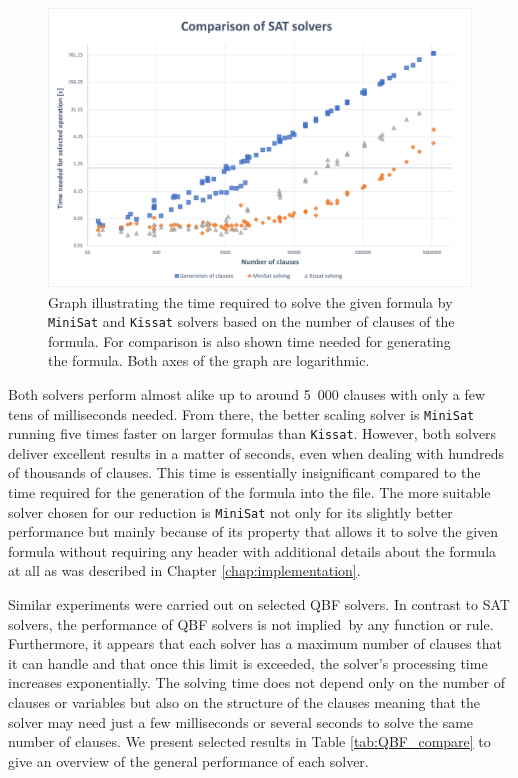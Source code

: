 \begin{figure}[ht]
    \label{fig:graph_SAT_compare}
    \centering
    \includegraphics[width=1\linewidth]{obrazky-figures/SAT_comparison.pdf}
    \caption{Graph illustrating the time required to solve the given formula by \texttt{MiniSat} and \texttt{Kissat} solvers based on the number of clauses of the formula. For comparison is also shown time needed for generating the formula. Both axes of the graph are logarithmic.}
\end{figure}
\vspace{0.3cm}

Both solvers perform almost alike up to around 5\ 000 clauses with only a few tens of milliseconds needed. From there, the better scaling solver is \texttt{MiniSat} running five times faster on larger formulas than \texttt{Kissat}. However, both solvers deliver excellent results in a matter of seconds, even when dealing with hundreds of thousands of clauses. This time is essentially insignificant compared to the time required for the generation of the formula into the file. The more suitable solver chosen for our reduction is \texttt{MiniSat} not only for its slightly better performance but mainly because of its property that allows it to solve the given formula without requiring any header with additional details about the formula at all as was described in Chapter \ref{chap:implementation}. 

Similar experiments were carried out on selected QBF solvers. In contrast to SAT solvers, the performance of QBF solvers is not implied by any function or rule. Furthermore, it appears that each solver has a maximum number of clauses that it can handle and that once this limit is exceeded, the solver's processing time increases exponentially. The solving time does not depend only on the number of clauses or variables but also on the structure of the clauses meaning that the solver may need just a few milliseconds or several seconds to solve the same number of clauses. We present selected results in Table \ref{tab:QBF_compare} to give an overview of the general performance of each solver.

